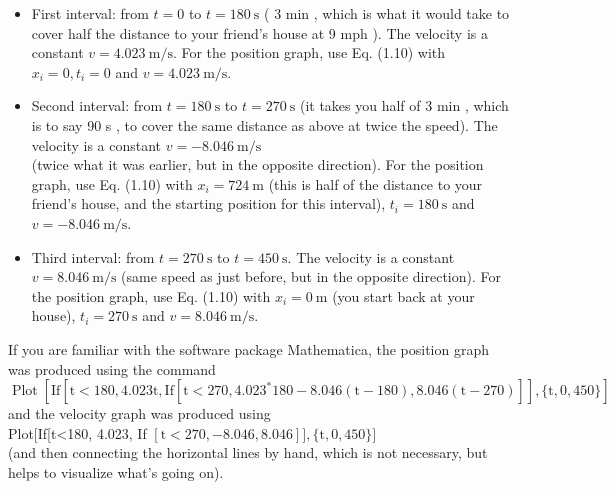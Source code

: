 \documentclass[10pt]{article}
\begin{document}
\begin{itemize}
  \item First interval: from $t=0$ to $t=180 \mathrm{~s}$ ( 3 min , which is what it would take to cover half the distance to your friend's house at 9 mph ). The velocity is a constant $v=4.023 \mathrm{~m} / \mathrm{s}$. For the position graph, use Eq. (1.10) with $x_{i}=0, t_{i}=0$ and $v=4.023 \mathrm{~m} / \mathrm{s}$.
  \item Second interval: from $t=180 \mathrm{~s}$ to $t=270 \mathrm{~s}$ (it takes you half of 3 min , which is to say 90 s , to cover the same distance as above at twice the speed). The velocity is a constant $v=-8.046 \mathrm{~m} / \mathrm{s}$\\
(twice what it was earlier, but in the opposite direction). For the position graph, use Eq. (1.10) with $x_{i}=724 \mathrm{~m}$ (this is half of the distance to your friend's house, and the starting position for this interval), $t_{i}=180 \mathrm{~s}$ and $v=-8.046 \mathrm{~m} / \mathrm{s}$.
  \item Third interval: from $t=270 \mathrm{~s}$ to $t=450 \mathrm{~s}$. The velocity is a constant $v=8.046 \mathrm{~m} / \mathrm{s}$ (same speed as just before, but in the opposite direction). For the position graph, use Eq. (1.10) with $x_{i}=0 \mathrm{~m}$ (you start back at your house), $t_{i}=270 \mathrm{~s}$ and $v=8.046 \mathrm{~m} / \mathrm{s}$.
\end{itemize}

If you are familiar with the software package Mathematica, the position graph was produced using the command\\
$\operatorname{Plot}\left[\mathrm{If}\left[\mathrm{t}<180,4.023 \mathrm{t}, \mathrm{If}\left[\mathrm{t}<270,4.023^{*} 180-8.046(\mathrm{t}-180), 8.046(\mathrm{t}-270)\right]\right],\{\mathrm{t}, 0,450\}\right]$\\
and the velocity graph was produced using\\
Plot[If[t<180, 4.023, If $[\mathrm{t}<270,-8.046,8.046]],\{\mathrm{t}, 0,450\}]$\\
(and then connecting the horizontal lines by hand, which is not necessary, but helps to visualize what's going on).
\end{document}
